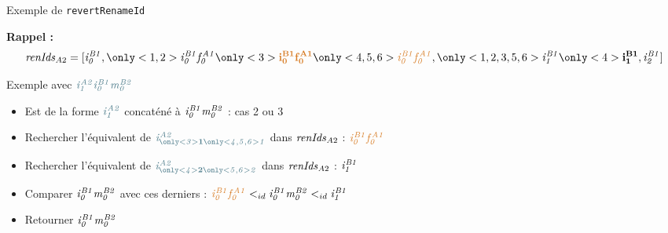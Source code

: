 \begin{frame}[fragile]{Exemple de \texttt{revertRenameId}}
\begin{figure}
{
    }
  \end{figure}
  \textbf{Rappel : }
  \begin{equation*}
      \renids{A2} = [\id{i}{B1}{0},\only<1,2>{\id{i}{B1}{0}\id{f}{A1}{0}}\only<3>{{\coloridone\id{\mathbf{i}}{\mathbf{B1}}{\mathbf{0}}\id{\mathbf{f}}{\mathbf{A1}}{\mathbf{0}}}}\only<4,5,6>{{\coloridone\id{i}{B1}{0}\id{f}{A1}{0}}},\only<1,2,3,5,6>{\id{i}{B1}{1}}\only<4>{\id{\mathbf{i}}{\mathbf{B1}}{\mathbf{1}}},\id{i}{B1}{2}]
  \end{equation*}
  \begin{block}{Exemple avec {$\coloridfour\id{i}{A2}{1}\id{i}{B1}{0}\id{m}{B2}{0}$}}
    \begin{itemize}
      \item<2-> Est de la forme ${\coloridfour\id{i}{A2}{1}}$ concaténé à $\mathit{i}^{\mathit{B1}}_{\mathit{0}}\mathit{m}^{\mathit{B2}}_{\mathit{0}}$ : cas 2 ou 3
      \item<3-> Rechercher l'équivalent de $\coloridtwo\id{i}{A2}{\only<3>{\mathbf{1}}\only<4,5,6>{1}}$ dans $\mathit{renIds}_{A2}$ : {$\coloridone\id{i}{B1}{0}\id{f}{A1}{0}$}
      \item<4-> Rechercher l'équivalent de $\coloridtwo\id{i}{A2}{\only<4>{\mathbf{2}}\only<5,6>{2}}$ dans $\mathit{renIds}_{A2}$ : $\mathit{i}^{\mathit{B1}}_{\mathit{1}}$
      \item<5-> Comparer $\mathit{i}^{\mathit{B1}}_{\mathit{0}}\mathit{m}^{\mathit{B2}}_{\mathit{0}}$ avec ces derniers : ${\coloridone\id{i}{B1}{0}\id{f}{A1}{0}} \lid \id{i}{B1}{0}\id{m}{B2}{0} \lid \id{i}{B1}{1}$
      \item<6-> Retourner $\mathit{i}^{\mathit{B1}}_{\mathit{0}}\mathit{m}^{\mathit{B2}}_{\mathit{0}}$
    \end{itemize}
  \end{block}
\end{frame}
